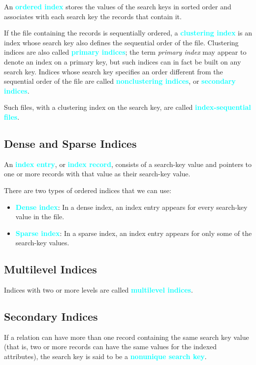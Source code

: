 \documentclass[a4paper,12pt,twoside,openany]{book}
\newcommand{\textcy}[1]{\textbf{\textcolor{cyan}{#1}}}
\begin{document}
An \textcy{ordered index} stores the values of the search keys in sorted order and associates with each search key the records that contain it.

If the file containing the records is sequentially ordered, a \textcy{clustering index} is an index whose search key also defines the sequential order of the file. Clustering indices are also called \textcy{primary indices}; the term \textit{primary index} may appear to denote an index on a primary key, but such indices can in fact be built on any search key. Indices whose search key specifies an order different from the sequential order of the file are called \textcy{nonclustering indices}, or \textcy{secondary indices}.

Such files, with a clustering index on the search key, are called \textcy{index-sequential files}.

\subsection{Dense and Sparse Indices}

An \textcy{index entry}, or \textcy{index record}, consists of a search-key value and pointers to one or more records with that value as their search-key value.

There are two types of ordered indices that we can use:
\begin{itemize}
    \item \textcy{Dense index}: In a dense index, an index entry appears for every search-key value in the file.
    \item \textcy{Sparse index}: In a sparse index, an index entry appears for only some of the search-key values.
\end{itemize}

\subsection{Multilevel Indices}

Indices with two or more levels are called \textcy{multilevel indices}.

\subsection{Secondary Indices}

If a relation can have more than one record containing the same search key value (that is, two or more records can have the same values for the indexed attributes), the search key is said to be a \textcy{nonunique search key}.
\end{document}
